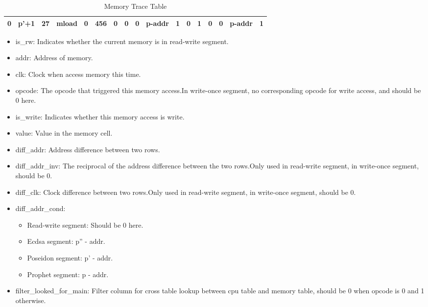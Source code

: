 \begin{table}[!ht]
\begin{adjustwidth}{-1.75cm}{}
\begin{tabular}{|c|c|c|c|c|c|c|c|c|c|c|c|c|c|c|c|c|}
            \hline
            \rowcolor{yellow!20} 0     & p'+1   & 27    & mload  & 0         & 456   & \cellcolor{lightgray} 0        & \cellcolor{lightgray} 0     & \cellcolor{lightgray} 0     & p-addr                  & \cellcolor{violet!30} 1     & 0     & \cellcolor{pink} 1     & \cellcolor{pink} 0     & \cellcolor{pink} 0     & p-addr   & 1     \\
            \hline
        \end{tabular}
        \caption{Memory Trace Table}
        \label{table:memory-trace-table}
    \end{adjustwidth}
\end{table}

\begin{itemize}
    \item is\_rw: Indicates whether the current memory is in read-write segment.
    \item addr: Address of memory.
    \item clk: Clock when access memory this time.
    \item opcode: The opcode that triggered this memory access.In write-once segment, no corresponding opcode for write access, and should be 0 here.
    \item is\_write: Indicates whether this memory access is write.
    \item value: Value in the memory cell.
    \item diff\_addr: Address difference between two rows.
    \item diff\_addr\_inv: The reciprocal of the address difference between the two rows.Only used in read-write segment, in write-once segment, should be 0.
    \item diff\_clk: Clock difference between two rows.Only used in read-write segment, in write-once segment, should be 0.
    \item diff\_addr\_cond:
          \begin{itemize}
              \item Read-write segment: Should be 0 here.
              \item Ecdsa segment: p'' - addr.
              \item Poseidon segment: p' - addr.
              \item Prophet segment: p - addr.
          \end{itemize}
    \item filter\_looked\_for\_main: Filter column for cross table lookup between cpu table and memory table, should be 0 when opcode is 0 and 1 otherwise.

\end{itemize}
